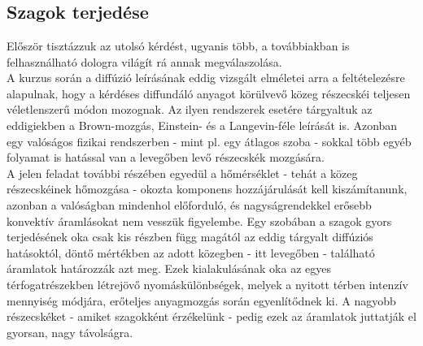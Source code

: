 \section{} \label{sec:1}

\subsection{Szagok terjedése} \label{sub:1.1}
Először tisztázzuk az utolsó kérdést, ugyanis több, a továbbiakban is felhasználható dologra világít rá annak megválaszolása. \\
A kurzus során a diffúzió leírásának eddig vizsgált elméletei arra a feltételezésre alapulnak, hogy a kérdéses diffundáló anyagot körülvevő közeg részecskéi teljesen véletlenszerű módon mozognak. Az ilyen rendszerek esetére tárgyaltuk az eddigiekben a Brown-mozgás, Einstein- és a Langevin-féle leírását is. Azonban egy valóságos fizikai rendszerben - mint pl. egy átlagos szoba - sokkal több egyéb folyamat is hatással van a levegőben levő részecskék mozgására. \\
A jelen feladat további részében egyedül a hőmérséklet - tehát a közeg részecskéinek hőmozgása - okozta komponens hozzájárulását kell kiszámítanunk, azonban a valóságban mindenhol előforduló, és nagyságrendekkel erősebb konvektív áramlásokat nem vesszük figyelembe. Egy szobában a szagok gyors terjedésének oka csak kis részben függ magától az eddig tárgyalt diffúziós hatásoktól, döntő mértékben az adott közegben - itt levegőben - található áramlatok határozzák azt meg. Ezek kialakulásának oka az egyes térfogatrészekben létrejövő nyomáskülönbségek, melyek a nyitott térben intenzív mennyiség módjára, erőteljes anyagmozgás során egyenlítődnek ki. A nagyobb részecskéket - amiket szagokként érzékelünk - pedig ezek az áramlatok juttatják el gyorsan, nagy távolságra.

